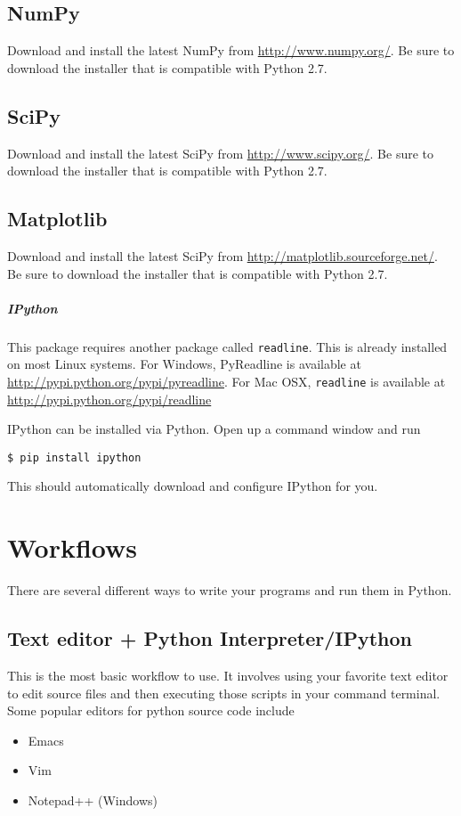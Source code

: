 \subsection*{NumPy}
Download and install the latest NumPy from \url{http://www.numpy.org/}.  Be sure to download the installer that is compatible with Python 2.7.

\subsection*{SciPy}
Download and install the latest SciPy from \url{http://www.scipy.org/}.  Be sure to download the installer that is compatible with Python 2.7.

\subsection*{Matplotlib}
Download and install the latest SciPy from \url{http://matplotlib.sourceforge.net/}.  Be sure to download the installer that is compatible with Python 2.7.

\subparagraph*{IPython}
This package requires another package called \texttt{readline}.  This is already installed on most Linux systems.  For Windows, PyReadline is available at \url{http://pypi.python.org/pypi/pyreadline}.  For Mac OSX, \texttt{readline} is available at \url{http://pypi.python.org/pypi/readline}

IPython can be installed via Python.  Open up a command window and run
\begin{lstlisting}
$ pip install ipython
\end{lstlisting}

This should automatically download and configure IPython for you.

\section*{Workflows}
There are several different ways to write your programs and run them in Python.

\subsection*{Text editor + Python Interpreter/IPython}
This is the most basic workflow to use.  It involves using your favorite text editor to edit source files and then executing those scripts in your command terminal.  Some popular editors for python source code include
\begin{itemize}
\item Emacs
\item Vim
\item Notepad++ (Windows)
\end{itemize}

